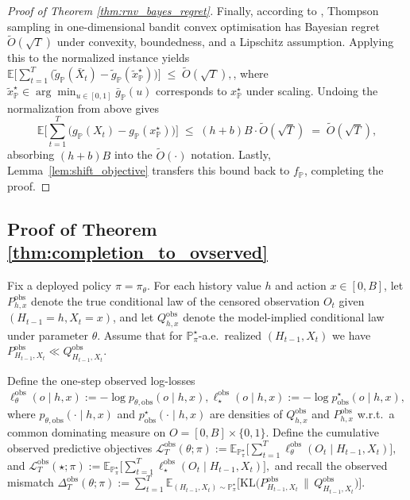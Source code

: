 \documentclass[11pt]{article}
\renewcommand{\P}{\mathbb{P}}
\begin{document}
\begin{proof}[Proof of Theorem \ref{thm:rnv_bayes_regret}]
Finally, according to \cite[Theorem 4]{bakhtiari2025bco}, Thompson sampling in one-dimensional bandit convex optimisation has Bayesian regret \(\tilde O(\sqrt{T})\) under convexity, boundedness, and a Lipschitz assumption. Applying this to the normalized instance yields
\(
\mathbb{E}\Big[\sum_{t=1}^T \big(\tilde g_\P(\bar X_t) - \tilde g_\P(\tilde x_\P^\star)\big)\Big]
\;\le\; \tilde O(\sqrt{T}),
\), where \(\tilde x_\P^\star\in\arg\min_{u\in[0,1]}\bar g_\P(u)\) corresponds to \(x_\P^\star\) under scaling.
Undoing the normalization from above gives
\[
\mathbb{E}\Big[\sum_{t=1}^T \big(g_\P(X_t)-g_\P(x_\P^\star)\big)\Big]
\;\le\; (h+b)B \cdot \tilde O(\sqrt{T})
\;=\; \tilde O(\sqrt{T}),
\]
absorbing \((h+b)B\) into the \(\tilde O(\cdot)\) notation.
Lastly, Lemma~\ref{lem:shift_objective} transfers this bound back to \(f_\P\), completing the proof.
\end{proof}



\subsection{Proof of Theorem \ref{thm:completion_to_ovserved}}
\label{app:proof-thm-4.8}

Fix a deployed policy $\pi=\pi_\theta$. For each history value $h$ and action $x\in[0,B]$, let
$P^{\mathrm{obs}}_{h,x}$ denote the true conditional law of the censored observation
$O_t$ given $(H_{t-1}=h,X_t=x)$, and let $Q^{\mathrm{obs}}_{h,x}$ denote the model-implied conditional law
under parameter $\theta$. Assume that for $\P^\star_\pi$-a.e.\ realized $(H_{t-1},X_t)$ we have
$P^{\mathrm{obs}}_{H_{t-1},X_t}\ll Q^{\mathrm{obs}}_{H_{t-1},X_t}$.


Define the one-step observed log-losses
\(
\ell^{\mathrm{obs}}_\theta(o\mid h,x)
:= -\log p_{\theta,\mathrm{obs}}(o\mid h,x),
\ell^{\mathrm{obs}}_\star(o\mid h,x)
:= -\log p^\star_{\mathrm{obs}}(o\mid h,x),
\)
where $p_{\theta,\mathrm{obs}}(\cdot\mid h,x)$ and $p^\star_{\mathrm{obs}}(\cdot\mid h,x)$ are densities
of $Q^{\mathrm{obs}}_{h,x}$ and $P^{\mathrm{obs}}_{h,x}$ w.r.t.\ a common dominating measure on $O=[0,B]\times\{0,1\}$. Define the cumulative observed predictive objectives
\(
\mathcal{L}^{\mathrm{obs}}_T(\theta;\pi)
:= \mathbb{E}_{\P^\star_\pi}\!\Big[\sum_{t=1}^T \ell^{\mathrm{obs}}_\theta(O_t\mid H_{t-1},X_t)\Big],\) and \(\mathcal{L}^{\mathrm{obs}}_T(\star;\pi)
:= \mathbb{E}_{\P^\star_\pi}\!\Big[\sum_{t=1}^T \ell^{\mathrm{obs}}_\star(O_t\mid H_{t-1},X_t)\Big],
\)
and recall the observed mismatch
\(
\Delta^{\mathrm{obs}}_T(\theta;\pi)
:= \sum_{t=1}^T \mathbb{E}_{(H_{t-1},X_t)\sim \P^\star_\pi}
\Big[\mathrm{KL}\!\big(P^{\mathrm{obs}}_{H_{t-1},X_t}\,\|\,Q^{\mathrm{obs}}_{H_{t-1},X_t}\big)\Big].
\)
\end{document}
